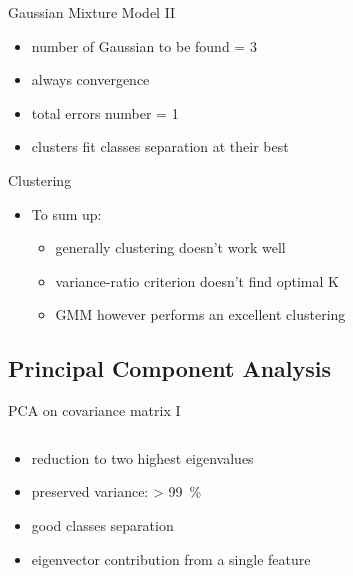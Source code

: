 \documentclass{beamer}
\begin{document}
\begin{frame}{Gaussian Mixture Model II}
	\begin{itemize}
		\item{
		number of Gaussian to be found = 3
		}
		\item{
		always convergence
		}
		\item{
		total errors number = 1
		}
		\item{
		clusters fit classes separation at their best
		}
	\end{itemize}
\end{frame}

\begin{frame}{Clustering}
  \begin{itemize}
  \item
    To sum up:
    \begin{itemize}
    \item
      generally clustering doesn't work well
    \item
      variance-ratio criterion doesn't find optimal K
    \item
      GMM however performs an excellent clustering
    \end{itemize}
  \end{itemize}
\end{frame}


\subsection{Principal Component Analysis}

\begin{frame}{PCA on covariance matrix I}
\begin{columns}[t]
\begin{column}{.3\textwidth}
\end{column}
\begin{column}{.3\textwidth}
\end{column}
\begin{column}{.3\textwidth}
\end{column}
\end{columns}

\vspace*{10pt}

\begin{itemize}
	\item{
	reduction to two highest eigenvalues
	}
	\item{
	preserved variance: > \SI{99}{\percent}
	}
	\item{
	good classes separation
	}
	\item{
	eigenvector contribution from a single feature
	}
\end{itemize}
\end{frame}
\end{document}
